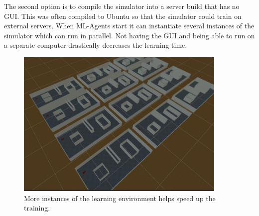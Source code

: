 The second option is to compile the simulator into a server build that has no GUI. This was often compiled to Ubuntu so that the simulator could train on external servers. When ML-Agents start it can instantiate several instances of the simulator which can run in parallel. Not having the GUI and being able to run on a separate computer drastically decreases the learning time. 


\begin{figure}[h]
    \centering
    \includegraphics[width=0.9\textwidth]{06_Implementation/00_MLAgents/Images/TrainingMap.JPG}
    \caption[Training Scene]{More instances of the learning environment helps speed up the training.} \label{06:trainingScene}
\end{figure}


%






